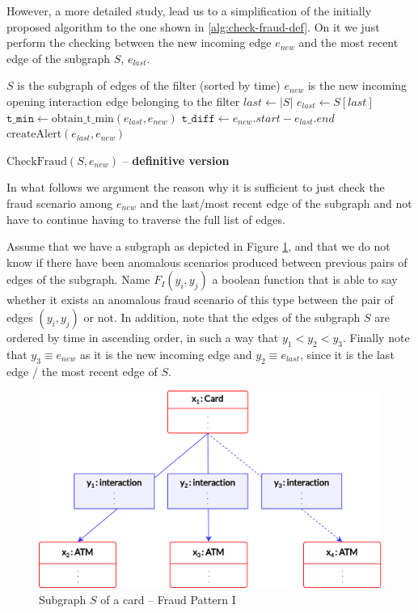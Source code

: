 However, a more detailed study, lead us to a simplification of the initially proposed algorithm to the one shown in \ref{alg:check-fraud-def}. On it we just perform the checking between the new incoming edge $e_{new}$ and the most recent edge of the subgraph $S$, $e_{last}$.

\begin{algorithm}[H]
  \small
  \begin{algorithmic}[1]
  \REQUIRE $S$ is the subgraph of edges of the filter (sorted by time)
  \REQUIRE $e_{new}$ is the new incoming opening interaction edge belonging to the filter 
  \STATE $last \gets |S|$
  \STATE $e_{last} \gets S[last]$
  \STATE $\texttt{t\_min} \gets \text{obtain\_t\_min}(e_{last}, e_{new})$
  \STATE $\texttt{t\_diff} \gets e_{new}.start - e_{last}.end$
    \STATE $\text{createAlert}(e_{last}, e_{new})$
  \ENDIF
  \end{algorithmic}
  \caption{$\text{CheckFraud}(S, e_{new})$ -- \textbf{definitive version}}
  \label{alg:check-fraud-def}
\end{algorithm}


In what follows we argument the reason why it is sufficient to just check the fraud scenario among $e_{new}$ and the last/most recent edge of the subgraph and not have to continue having to traverse the full list of edges.

Assume that we have a subgraph as depicted in Figure \ref{img:fp-I-demo}, and that we do not know if there have been anomalous scenarios produced between previous pairs of edges of the subgraph. Name $F_I(y_i,y_j)$ a boolean function that is able to say whether it exists an anomalous fraud scenario of this type between the pair of edges $(y_i,y_j)$ or not. In addition, note that the edges of the subgraph $S$ are ordered by time in ascending order, in such a way that $y_1 < y_2 < y_3$. Finally note that $y_3 \equiv e_{new}$ as it is the new incoming edge and $y_2 \equiv e_{last}$, since it is the last edge / the most recent edge of $S$.

\begin{figure}[H]
  \centering
  \includegraphics[scale = 0.7]{images/2-QueryModel/fp-I-demo-1.png}
  \caption{Subgraph $S$ of a card -- Fraud Pattern I}
  \label{img:fp-I-demo}
\end{figure}

